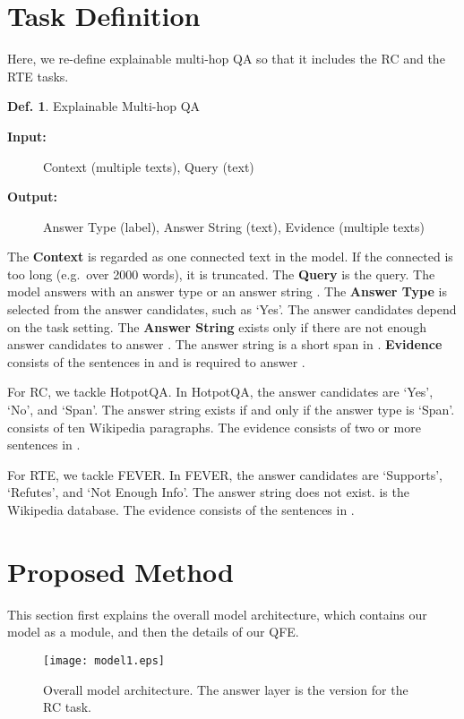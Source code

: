 \documentclass[11pt,a4paper]{article}
\theoremstyle{definition}
\newtheorem{defi}{Def.}
\begin{document}
	\section{Task Definition}
	\label{sec:Definition}
    Here, we re-define explainable multi-hop QA so that it includes the RC and the RTE tasks.
    \begin{defi} Explainable Multi-hop QA
		\begin{description}
			\item[\textbf{Input:}] Context  (multiple texts), Query  (text)
			\item[\textbf{Output:}] Answer Type  (label), Answer String  (text), Evidence  (multiple texts)
		\end{description}
		The \textbf{Context } is regarded as one connected text in the model.
	    If the connected  is too long (e.g.~over 2000 words), it is truncated.
		The \textbf{Query } is the query. The model answers  with an answer type  or an answer string . The \textbf{Answer Type } is selected from the answer candidates, such as `Yes'. The answer candidates depend on the task setting. The \textbf{Answer String } exists only if there are not enough answer candidates to answer . The answer string  is a short span in . \textbf{Evidence}  consists of the sentences in  and is required to answer .
	\end{defi}

    For RC, we tackle HotpotQA. In HotpotQA, the answer candidates are `Yes', `No', and `Span'. The answer string  exists if and only if the answer type  is `Span'.  consists of ten Wikipedia paragraphs. The evidence  consists of two or more sentences in .

	For RTE, we tackle FEVER. In FEVER, the answer candidates are `Supports', `Refutes', and `Not Enough Info'. The answer string  does not exist.  is the Wikipedia database. 
	The evidence  consists of the sentences in . 

	\section{Proposed Method}
	
	This section first explains the overall model architecture, which contains our model as a module, and then the details of our QFE.
	\label{sec:proposed}
	
	\begin{figure}[t]
		\begin{center}
			\texttt{[image: model1.eps]} \caption{Overall model architecture. The answer layer is the version for the RC task.}
			\label{hotpotmodel} \end{center}	
	\end{figure}
	
\end{document}
